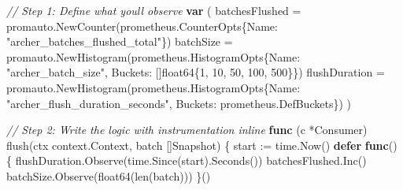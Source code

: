 \documentclass[
]{article}
\newenvironment{Shaded}{}{}
\newcommand{\BuiltInTok}[1]{\textcolor[rgb]{0.00,0.50,0.00}{#1}}
\newcommand{\CommentTok}[1]{\textcolor[rgb]{0.38,0.63,0.69}{\textit{#1}}}
\newcommand{\ControlFlowTok}[1]{\textcolor[rgb]{0.00,0.44,0.13}{\textbf{#1}}}
\newcommand{\DataTypeTok}[1]{\textcolor[rgb]{0.56,0.13,0.00}{#1}}
\newcommand{\DecValTok}[1]{\textcolor[rgb]{0.25,0.63,0.44}{#1}}
\newcommand{\KeywordTok}[1]{\textcolor[rgb]{0.00,0.44,0.13}{\textbf{#1}}}
\newcommand{\NormalTok}[1]{#1}
\newcommand{\OperatorTok}[1]{\textcolor[rgb]{0.40,0.40,0.40}{#1}}
\newcommand{\StringTok}[1]{\textcolor[rgb]{0.25,0.44,0.63}{#1}}
\begin{document}
\begin{Shaded}
\begin{Highlighting}[]
\CommentTok{// Step 1: Define what you\textquotesingle{}ll observe}
\KeywordTok{var} \OperatorTok{(}
\NormalTok{    batchesFlushed }\OperatorTok{=}\NormalTok{ promauto}\OperatorTok{.}\NormalTok{NewCounter}\OperatorTok{(}\NormalTok{prometheus}\OperatorTok{.}\NormalTok{CounterOpts}\OperatorTok{\{}\NormalTok{Name}\OperatorTok{:} \StringTok{"archer\_batches\_flushed\_total"}\OperatorTok{\})}
\NormalTok{    batchSize      }\OperatorTok{=}\NormalTok{ promauto}\OperatorTok{.}\NormalTok{NewHistogram}\OperatorTok{(}\NormalTok{prometheus}\OperatorTok{.}\NormalTok{HistogramOpts}\OperatorTok{\{}\NormalTok{Name}\OperatorTok{:} \StringTok{"archer\_batch\_size"}\OperatorTok{,}\NormalTok{ Buckets}\OperatorTok{:} \OperatorTok{[]}\DataTypeTok{float64}\OperatorTok{\{}\DecValTok{1}\OperatorTok{,} \DecValTok{10}\OperatorTok{,} \DecValTok{50}\OperatorTok{,} \DecValTok{100}\OperatorTok{,} \DecValTok{500}\OperatorTok{\}\})}
\NormalTok{    flushDuration  }\OperatorTok{=}\NormalTok{ promauto}\OperatorTok{.}\NormalTok{NewHistogram}\OperatorTok{(}\NormalTok{prometheus}\OperatorTok{.}\NormalTok{HistogramOpts}\OperatorTok{\{}\NormalTok{Name}\OperatorTok{:} \StringTok{"archer\_flush\_duration\_seconds"}\OperatorTok{,}\NormalTok{ Buckets}\OperatorTok{:}\NormalTok{ prometheus}\OperatorTok{.}\NormalTok{DefBuckets}\OperatorTok{\})}
\OperatorTok{)}

\CommentTok{// Step 2: Write the logic with instrumentation inline}
\KeywordTok{func} \OperatorTok{(}\NormalTok{c }\OperatorTok{*}\NormalTok{Consumer}\OperatorTok{)}\NormalTok{ flush}\OperatorTok{(}\NormalTok{ctx context}\OperatorTok{.}\NormalTok{Context}\OperatorTok{,}\NormalTok{ batch }\OperatorTok{[]}\NormalTok{Snapshot}\OperatorTok{)} \OperatorTok{\{}
\NormalTok{    start }\OperatorTok{:=}\NormalTok{ time}\OperatorTok{.}\NormalTok{Now}\OperatorTok{()}
    \ControlFlowTok{defer} \KeywordTok{func}\OperatorTok{()} \OperatorTok{\{}
\NormalTok{        flushDuration}\OperatorTok{.}\NormalTok{Observe}\OperatorTok{(}\NormalTok{time}\OperatorTok{.}\NormalTok{Since}\OperatorTok{(}\NormalTok{start}\OperatorTok{).}\NormalTok{Seconds}\OperatorTok{())}
\NormalTok{        batchesFlushed}\OperatorTok{.}\NormalTok{Inc}\OperatorTok{()}
\NormalTok{        batchSize}\OperatorTok{.}\NormalTok{Observe}\OperatorTok{(}\DataTypeTok{float64}\OperatorTok{(}\BuiltInTok{len}\OperatorTok{(}\NormalTok{batch}\OperatorTok{)))}
    \OperatorTok{\}()}


\end{Highlighting}
\end{Shaded}
\end{document}
